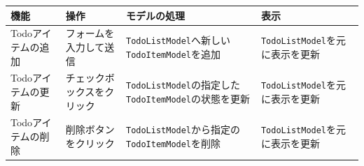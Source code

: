 \begin{longtable}[]{@{}llll@{}}
\toprule
\begin{minipage}[b]{0.10\columnwidth}\raggedright
機能\strut
\end{minipage} & \begin{minipage}[b]{0.14\columnwidth}\raggedright
操作\strut
\end{minipage} & \begin{minipage}[b]{0.48\columnwidth}\raggedright
モデルの処理\strut
\end{minipage} & \begin{minipage}[b]{0.17\columnwidth}\raggedright
表示\strut
\end{minipage}\tabularnewline
\midrule
\endhead
\begin{minipage}[t]{0.10\columnwidth}\raggedright
Todoアイテムの追加\strut
\end{minipage} & \begin{minipage}[t]{0.14\columnwidth}\raggedright
フォームを入力して送信\strut
\end{minipage} & \begin{minipage}[t]{0.48\columnwidth}\raggedright
\texttt{TodoListModel}へ新しい\texttt{TodoItemModel}を追加\strut
\end{minipage} & \begin{minipage}[t]{0.17\columnwidth}\raggedright
\texttt{TodoListModel}を元に表示を更新\strut
\end{minipage}\tabularnewline
\begin{minipage}[t]{0.10\columnwidth}\raggedright
Todoアイテムの更新\strut
\end{minipage} & \begin{minipage}[t]{0.14\columnwidth}\raggedright
チェックボックスをクリック\strut
\end{minipage} & \begin{minipage}[t]{0.48\columnwidth}\raggedright
\texttt{TodoListModel}の指定した\texttt{TodoItemModel}の状態を更新\strut
\end{minipage} & \begin{minipage}[t]{0.17\columnwidth}\raggedright
\texttt{TodoListModel}を元に表示を更新\strut
\end{minipage}\tabularnewline
\begin{minipage}[t]{0.10\columnwidth}\raggedright
Todoアイテムの削除\strut
\end{minipage} & \begin{minipage}[t]{0.14\columnwidth}\raggedright
削除ボタンをクリック\strut
\end{minipage} & \begin{minipage}[t]{0.48\columnwidth}\raggedright
\texttt{TodoListModel}から指定の\texttt{TodoItemModel}を削除\strut
\end{minipage} & \begin{minipage}[t]{0.17\columnwidth}\raggedright
\texttt{TodoListModel}を元に表示を更新\strut
\end{minipage}\tabularnewline
\bottomrule
\end{longtable}

